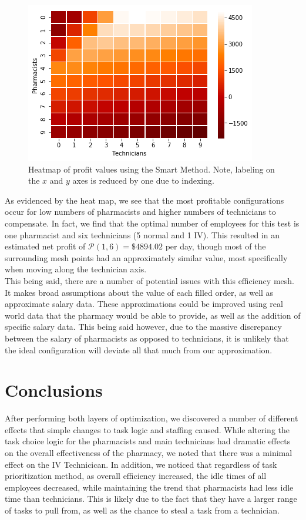 \documentclass[10pt]{report}            %
\begin{document}
\begin{figure}[H]
\centering
\includegraphics[scale=.75]{profitheatmap.png}
\caption{Heatmap of profit values using the Smart Method. Note, labeling on the $x$ and $y$ axes is reduced by one due to indexing.}
\label{fig:heatmap}
\end{figure}
As evidenced by the heat map, we see that the most profitable configurations occur for low numbers of pharmacists and higher numbers of technicians to compensate.  In fact, we find that the optimal number of employees for this test is one pharmacist and six technicians (5 normal and 1 IV). This resulted in an estimated net profit of $\mathcal{P}(1,6)=\$4894.02$ per day, though most of the surrounding mesh points had an approximately similar value, most specifically when moving along the technician axis.\\
This being said, there are a number of potential issues with this efficiency mesh. It makes broad assumptions about the value of each filled order, as well as approximate salary data. These approximations could be improved using real world data that the pharmacy would be able to provide, as well as the addition of specific salary data. This being said however, due to the massive discrepancy between the salary of pharmacists as opposed to technicians, it is unlikely that the ideal configuration will deviate all that much from our approximation.
\section*{Conclusions}
After performing both layers of optimization, we discovered a number of different effects that simple changes to task logic and staffing caused. While altering the task choice logic for the pharmacists and main technicians had dramatic effects on the overall effectiveness of the pharmacy, we noted that there was a minimal effect on the IV Technicican. In addition, we noticed that regardless of task prioritization method, as overall efficiency increased, the idle times of all employees decreased, while maintaining the trend that pharmacists had less idle time than technicians. This is likely due to the fact that they have a larger range of tasks to pull from, as well as the chance to steal a task from a technician.
\end{document}
